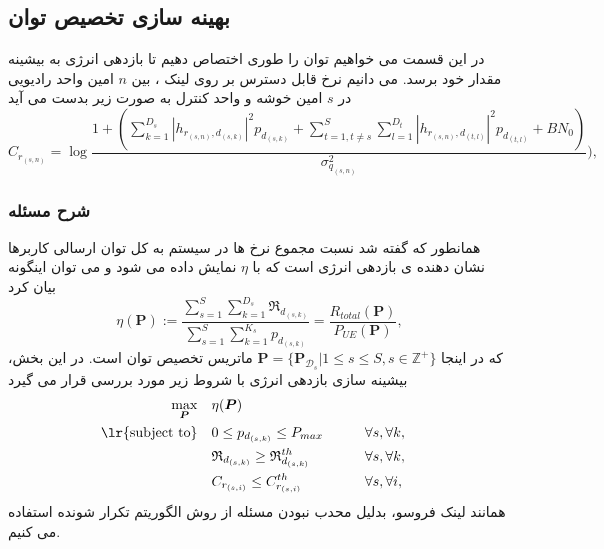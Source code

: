\subsection{بهینه سازی تخصیص توان}
در این قسمت می خواهیم توان را طوری اختصاص دهیم تا بازدهی انرژی به بیشینه مقدار خود برسد.
می دانیم نرخ قابل دسترس بر روی لینک ، بین $n$ امین واحد رادیویی در $s$ امین خوشه  و  واحد کنترل به صورت زیر بدست می آید 
\begin{equation}
C_{r_{(s,n)}} = \log{\frac{1+( \sum_{k=1}^{D_s}|h_{r_{(s,n)},d_{(s,k)}}|^2{p_{d_{(s,k)}}} + \sum_{t=1,t\neq s}^{S}\sum_{l=1}^{D_t}|h_{r_{(s,n)},d_{(t,l)}}|^2{p_{d_{(t,l)}}}+ B N_0) }{ \sigma_{q_{(s,n)}}^2})},
\end{equation}
\subsubsection{شرح مسئله}
 همانطور که گفته شد نسبت مجموع نرخ ها در سیستم به کل توان ارسالی کاربرها نشان دهنده ی بازدهی انرژی است که با $\eta$ نمایش داده می شود و می توان اینگونه بیان کرد
\begin{equation}\label{eta1}
\eta(\boldsymbol{P}) := \frac{\sum\limits_{s=1}^{S} \sum\limits_{k=1}^{{D}_s}\mathfrak{R}_{d_{(s,k)}} }{\sum\limits_{s=1}^{S} \sum\limits_{k=1}^{{K}_s}{p}_{d_{(s,k)}}} = \frac{R_{total}(\boldsymbol{P})}{P_{UE}(\boldsymbol{P})},
\end{equation}
که در اینجا  $ \boldsymbol{P} = \{ \boldsymbol{P}_{\mathcal{D}_s}|  1 \leq s \leq S, s \in \mathbb{Z}^{+} \}$ ماتریس تخصیص توان است. در این بخش، بیشینه سازی بازدهی انرژی با شروط زیر مورد بررسی قرار می گیرد 
\begin{equation}\label{p11}
\begin{aligned}
\max\limits_{\boldsymbol{P}}   \quad &   \eta(\boldsymbol{P})\\
\text{\lr{subject to}} \quad  &  0 \leq {p}_{d_{(s,k)}} \leq P_{max} && \qquad \forall s, \forall k,   \\
&\mathfrak{R}_{d_{(s,k)}} \geq  \mathfrak{R}_{d_{(s,k)}}^{th} && \qquad \forall s, \forall k, \\ 
&C_{r_{(s,i)}} \leq C_{r_{(s,i)}}^{th}  &&\qquad \forall s, \forall i, \\
\end{aligned}			
\end{equation}
همانند لینک فروسو، بدلیل محدب نبودن مسئله از روش الگوریتم تکرار شونده استفاده می کنیم.
